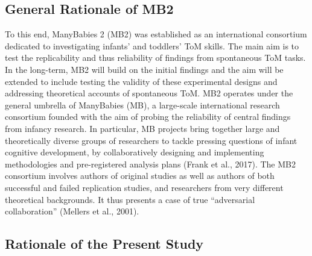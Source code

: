 \documentclass[
  english,
  man,floatsintext]{apa6}
\begin{document}
\hypertarget{general-rationale-of-mb2}{%
\subsection{General Rationale of MB2}\label{general-rationale-of-mb2}}

To this end, ManyBabies 2 (MB2) was established as an international consortium dedicated to investigating infants' and toddlers' ToM skills. The main aim is to test the replicability and thus reliability of findings from spontaneous ToM tasks. In the long-term, MB2 will build on the initial findings and the aim will be extended to include testing the validity of these experimental designs and addressing theoretical accounts of spontaneous ToM. MB2 operates under the general umbrella of ManyBabies (MB), a large-scale international research consortium founded with the aim of probing the reliability of central findings from infancy research. In particular, MB projects bring together large and theoretically diverse groups of researchers to tackle pressing questions of infant cognitive development, by collaboratively designing and implementing methodologies and pre-registered analysis plans (Frank et al., 2017). The MB2 consortium involves authors of original studies as well as authors of both successful and failed replication studies, and researchers from very different theoretical backgrounds. It thus presents a case of true ``adversarial collaboration'' (Mellers et al., 2001).

\hypertarget{rationale-of-the-present-study}{%
\subsection{Rationale of the Present Study}\label{rationale-of-the-present-study}}
\end{document}

